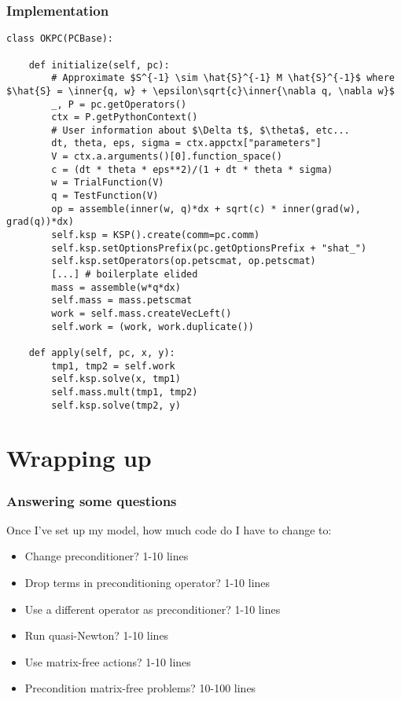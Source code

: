 \documentclass[presentation]{beamer}
\newcommand{\inner}[1]{\left\langle #1 \right \rangle}
\begin{document}
\begin{frame}[fragile]
  \frametitle{Implementation}
\begin{verbatim}
class OKPC(PCBase):

    def initialize(self, pc):
        # Approximate $S^{-1} \sim \hat{S}^{-1} M \hat{S}^{-1}$ where $\hat{S} = \inner{q, w} + \epsilon\sqrt{c}\inner{\nabla q, \nabla w}$
        _, P = pc.getOperators()
        ctx = P.getPythonContext()
        # User information about $\Delta t$, $\theta$, etc...
        dt, theta, eps, sigma = ctx.appctx["parameters"]
        V = ctx.a.arguments()[0].function_space()
        c = (dt * theta * eps**2)/(1 + dt * theta * sigma)
        w = TrialFunction(V)
        q = TestFunction(V)
        op = assemble(inner(w, q)*dx + sqrt(c) * inner(grad(w), grad(q))*dx)
        self.ksp = KSP().create(comm=pc.comm)
        self.ksp.setOptionsPrefix(pc.getOptionsPrefix + "shat_")
        self.ksp.setOperators(op.petscmat, op.petscmat)
        [...] # boilerplate elided
        mass = assemble(w*q*dx)
        self.mass = mass.petscmat
        work = self.mass.createVecLeft()
        self.work = (work, work.duplicate())

    def apply(self, pc, x, y):
        tmp1, tmp2 = self.work
        self.ksp.solve(x, tmp1)
        self.mass.mult(tmp1, tmp2)
        self.ksp.solve(tmp2, y)
\end{verbatim}
\end{frame}

\section{Wrapping up}

\begin{frame}
  \frametitle{Answering some questions}
  Once I've set up my model, how much code do I have to change to:

  \begin{itemize}
  \item Change preconditioner? 1-10 lines
  \item Drop terms in preconditioning operator? 1-10 lines
  \item Use a different operator as preconditioner? 1-10 lines
  \item Run quasi-Newton? 1-10 lines
  \item Use matrix-free actions? 1-10 lines
  \item Precondition matrix-free problems? 10-100 lines
  \end{itemize}
\end{frame}
\end{document}
